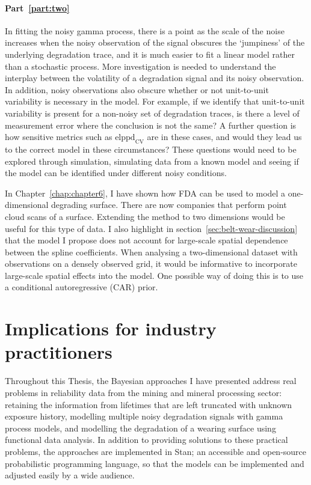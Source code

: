 \paragraph*{Part~\ref{part:two}} In fitting the noisy gamma process, there is a point as the scale of the noise increases when the noisy observation of the signal obscures the `jumpiness' of the underlying degradation trace, and it is much easier to fit a linear model rather than a stochastic process. More investigation is needed to understand the interplay between the volatility of a degradation signal and its noisy observation. In addition, noisy observations also obscure whether or not unit-to-unit variability is necessary in the model. For example, if we identify that unit-to-unit variability is present for a non-noisy set of degradation traces, is there a level of measurement error where the conclusion is not the same? A further question is how sensitive metrics such as $\mbox{elppd}_{\text{CV}}$ are in these cases, and would they lead us to the correct model in these circumstances? These questions would need to be explored through simulation, simulating data from a known model and seeing if the model can be identified under different noisy conditions.

In Chapter~\ref{chap:chapter6}, I have shown how FDA can be used to model a one-dimensional degrading surface. There are now companies that perform point cloud scans of a surface. Extending the method to two dimensions would be useful for this type of data. I also highlight in section~\ref{sec:belt-wear-discussion} that the model I propose does not account for large-scale spatial dependence between the spline coefficients. When analysing a two-dimensional dataset with observations on a densely observed grid, it would be informative to incorporate large-scale spatial effects into the model. One possible way of doing this is to use a conditional autoregressive (CAR) prior.

\section{Implications for industry practitioners} \label{sec:Thesis-practical}

Throughout this Thesis, the Bayesian approaches I have presented address real problems in reliability data from the mining and mineral processing sector: retaining the information from lifetimes that are left truncated with unknown exposure history, modelling multiple noisy degradation signals with gamma process models, and modelling the degradation of a wearing surface using functional data analysis. In addition to providing solutions to these practical problems, the approaches are implemented in Stan; an accessible and open-source probabilistic programming language, so that the models can be implemented and adjusted easily by a wide audience.

